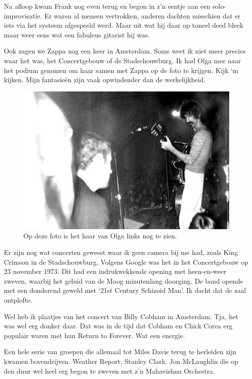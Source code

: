 \documentclass[10pt,twoside, openright]{memoir}
\begin{document}
Na afloop kwam Frank nog even terug en begon in z’n eentje aan een solo-improvisatie. Er waren al mensen vertrokken, anderen dachten misschien dat er iets via het systeem afgespeeld werd. Maar uit wat hij daar op toneel deed bleek maar weer eens wat een fabuleus gitarist hij was.

Ook zagen we Zappa nog een keer in Amsterdam. Soms weet ik niet meer precies waar het was, het Concertgebouw of de Stadschouwburg. Ik had Olga mee naar het podium genomen om haar samen met Zappa op de foto te krijgen. Kijk ‘m kijken. Mijn fantasieën zijn vaak opwindender dan de werkelijkheid.

\begin{figure}
\includegraphics[width=\textwidth]{img/ch31/zappaolga}
\caption*{\footnotesize Op deze foto is het haar van Olga links nog te zien.}
\end{figure}

Er zijn nog wat concerten geweest waar ik geen camera bij me had, zoals King Crimson in de Stadschouwburg. Volgens Google was het in het Concertgebouw op 23 november 1973. Dit had een indrukwekkende opening met heen-en-weer zweven, waarbij het geluid van de Moog minutenlang doorging. De band opende met een donderend geweld met `21st Century Schizoid Man'. Ik dacht dat de zaal ontplofte.

Wel heb ik plaatjes van het concert van Billy Cobham in Amsterdam. Tja, het was wel erg donker daar. Dat was in de tijd dat Cobham en Chick Corea erg populair waren met hun Return to Forever. Wat een energie. 

Een hele serie van groepen die allemaal tot Miles Davis terug te herleiden zijn kwamen bovendrijven. Weather Report, Stanley Clark. Jon McLaughlin die op den duur wel heel erg begon te zweven met z’n Mahavishnu Orchestra.
\end{document}
